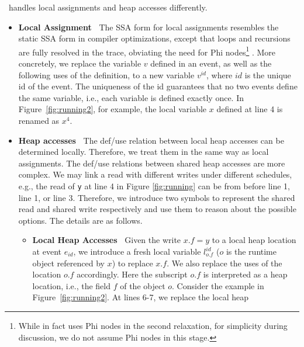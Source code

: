 \tool\ handles local assignments and heap accesses differently.
\begin{itemize}
\item {\bf Local Assignment\ } The SSA form for local assignments 
resembles the static SSA form in compiler optimizations, 
except that loops and recursions are fully resolved in the trace, 
obviating the need for {\sf Phi} nodes\footnote{While \tool in fact uses
Phi nodes in the second relaxation, for simplicity during discussion, we 
do not assume Phi nodes in this stage.} . More concretely, we replace the 
variable $v$ defined in an event, as well as the following uses of the 
definition, to a new variable $v^{id}$, where $id$ is the unique id 
of the event. The uniqueness of the id guarantees that no two events 
define the same variable, i.e., each variable is defined exactly once.  
In Figure~\ref{fig:running2}, for example,
the local variable $x$ defined at line 4 is renamed as $x^4$.
\item {\bf Heap accesses\ } The def/use relation between local heap accesses 
can be determined locally. Therefore, we treat them in the same way as 
local assignments. The def/use relations between shared heap accesses 
are more complex. We may link a read with different writes under different 
schedules, e.g., the read of {\tt y} at line 4 in Figure \ref{fig:running} can 
be from before line 1, line 1, or line 3. Therefore, we introduce two symbols to represent the shared read and shared write respectively and use them 
to reason about the possible options.
The details are as follows. 
\begin{itemize}
\item {\bf Local Heap Accesses\ } Given the write $x.f=y$ to a local heap 
location at event $e_{id}$,  we introduce a fresh local variable 
{\tt $l^{id}_{o.f}$} ($o$ is the runtime object referenced by $x$) to 
replace $x.f$. We also replace the uses of the location $o.f$ accordingly.
Here  the subscript $o.f$ is interpreted as a heap location, i.e., the 
field $f$ of the object $o$. Consider the example in 
Figure~\ref{fig:running2}. At lines 6-7, we replace the local heap 

\end{itemize}
\end{itemize}
